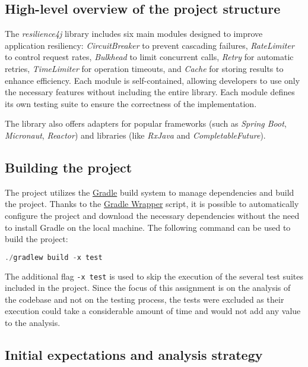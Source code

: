\subsection{High-level overview of the project structure}

The \textit{resilience4j} library includes six main modules designed to improve application resiliency: \textit{CircuitBreaker} to prevent cascading failures, \textit{RateLimiter} to control request rates, \textit{Bulkhead} to limit concurrent calls, \textit{Retry} for automatic retries, \textit{TimeLimiter} for operation timeouts, and \textit{Cache} for storing results to enhance efficiency. Each module is self-contained, allowing developers to use only the necessary features without including the entire library. Each module defines its own testing suite to ensure the correctness of the implementation.

The library also offers adapters for popular frameworks (such as \textit{Spring Boot}, \textit{Micronaut}, \textit{Reactor}) and libraries (like \textit{RxJava} and \textit{CompletableFuture}).

\subsection{Building the project}

The project utilizes the \href{https://gradle.org/}{Gradle} build system to manage dependencies and build the project. Thanks to the \href{https://docs.gradle.org/current/userguide/gradle_wrapper.html}{Gradle Wrapper} script, it is possible to automatically configure the project and download the necessary dependencies without the need to install Gradle on the local machine. The following command can be used to build the project:

\begin{lstlisting}[language=C++, caption=Building the project]
                          ./gradlew build -x test
\end{lstlisting}

The additional flag \texttt{-x test} is used to skip the execution of the several test suites included in the project. Since the focus of this assignment is on the analysis of the codebase and not on the testing process, the tests were excluded as their execution could take a considerable amount of time and would not add any value to the analysis.

\subsection{Initial expectations and analysis strategy}

